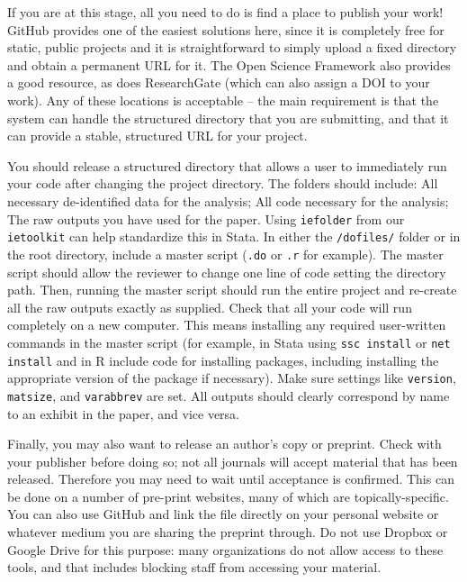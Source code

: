 If you are at this stage,
all you need to do is find a place to publish your work!
GitHub provides one of the easiest solutions here,
since it is completely free for static, public projects
and it is straightforward to simply upload a fixed directory
and obtain a permanent URL for it.
The Open Science Framework also provides a good resource,
as does ResearchGate (which can also assign a DOI to your work).
Any of these locations is acceptable --
the main requirement is that the system can handle
the structured directory that you are submitting,
and that it can provide a stable, structured URL for your project.

You should release a structured directory that allows a user
to immediately run your code after changing the project directory.
The folders should include:
All necessary de-identified data for the analysis;
All code necessary for the analysis;
The raw outputs you have used for the paper.
Using \texttt{iefolder} from our \texttt{ietoolkit} can help standardize this in Stata.
In either the \texttt{/dofiles/} folder or in the root directory,
include a master script (\texttt{.do} or \texttt{.r} for example).
The master script should allow the reviewer to change
one line of code setting the directory path.
Then, running the master script should run the entire project
and re-create all the raw outputs exactly as supplied.
Check that all your code will run completely on a new computer.
This means installing any required user-written commands in the master script
(for example, in Stata using \texttt{ssc install} or \texttt{net install}
and in R include code for installing packages,
including installing the appropriate version of the package if necessary).
Make sure settings like \texttt{version}, \texttt{matsize}, and \texttt{varabbrev} are set.
All outputs should clearly correspond by name to an exhibit in the paper, and vice versa.

Finally, you may also want to release an author's copy or preprint.
Check with your publisher before doing so;
not all journals will accept material that has been released.
Therefore you may need to wait until acceptance is confirmed.
This can be done on a number of pre-print websites,
many of which are topically-specific.
You can also use GitHub and link the file directly
on your personal website or whatever medium you are
sharing the preprint through.
Do not use Dropbox or Google Drive for this purpose:
many organizations do not allow access to these tools,
and that includes blocking staff from accessing your material.
